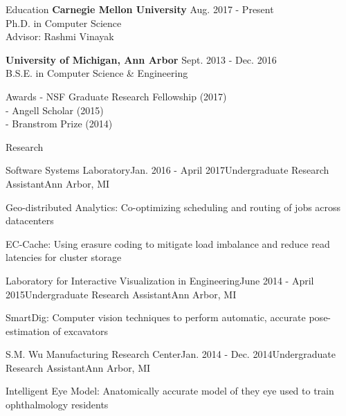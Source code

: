 \documentclass{resume} %
\begin{document}

\begin{rSection}{Education}
{\bf Carnegie Mellon University} \hfill {Aug. 2017 - Present} \\
Ph.D. in Computer Science \\
Advisor: Rashmi Vinayak

{\bf University of Michigan, Ann Arbor} \hfill {Sept. 2013 - Dec. 2016} \\ 
B.S.E. in Computer Science \& Engineering

\end{rSection}

\begin{rSection}{Awards}
- NSF Graduate Research Fellowship (2017)\\
- Angell Scholar (2015)\\
- Branstrom Prize (2014)

\end{rSection}


\begin{rSection}{Research}

\begin{rSubsection}{Software Systems Laboratory}{Jan. 2016 - April 2017}{Undergraduate Research Assistant}{Ann Arbor, MI}
\item Geo-distributed Analytics: Co-optimizing scheduling and routing of jobs across datacenters
\item EC-Cache: Using erasure coding to mitigate load imbalance and reduce read latencies for cluster storage
\end{rSubsection}

\begin{rSubsection}{Laboratory for Interactive Visualization in Engineering}{June 2014 - April 2015}{Undergraduate Research Assistant}{Ann Arbor, MI}
\item SmartDig: Computer vision techniques to perform automatic, accurate pose-estimation of excavators
\end{rSubsection}

\begin{rSubsection}{S.M. Wu Manufacturing Research Center}{Jan. 2014 - Dec. 2014}{Undergraduate Research Assistant}{Ann Arbor, MI}
\item Intelligent Eye Model: Anatomically accurate model of they eye used to train ophthalmology residents
\end{rSubsection}
\end{rSection}
\end{document}
